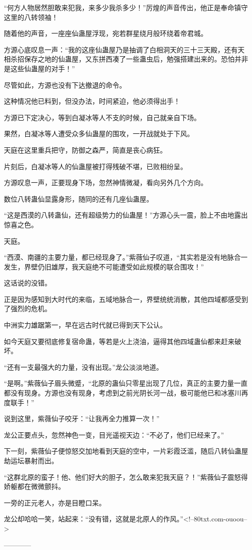 \begin{this_body}
“何方人物居然胆敢来犯我，来多少我杀多少！”厉煌的声音传出，他正是奉命镇守这里的八转领袖！

随着他的声音，一座座仙蛊屋浮现，宛若群星绕月般环绕着帝君城。

方源心底叹息一声：“我的这座仙蛊屋乃是抽调了白相洞天的三十三天殿，还有天相杀招保存之地的仙蛊屋，又东拼西凑了一些蛊虫后，勉强搭建出来的。恐怕并非是这些仙蛊屋的对手！”

尽管如此，方源也没有下达撤退的命令。

这种情况他已料到，但没办法，时间紧迫，他必须得出手！

方源已下定决心，等到白凝冰等人不支的时候，自己就亲自下场。

果然，白凝冰等人遭受众多仙蛊屋的围攻，一开战就处于下风。

天庭在这里重兵把守，防御之森严，简直是丧心病狂。

片刻后，白凝冰等人的仙蛊屋被打得残破不堪，已败相纷呈。

方源叹息一声，正要现身下场，忽然神情微凝，看向另外几个方向。

数位八转蛊仙显露身形，随同的还有几座仙蛊屋。

“这是西漠的八转蛊仙，还有超级势力的仙蛊屋！”方源心头一震，脸上不由地露出惊喜之色。

天庭。

“西漠、南疆的主要力量，都已经现身了。”紫薇仙子叹道，“其实若是没有地脉合一发生，界壁仍旧雄厚，我天庭绝不可能遭受如此规模的联合围攻！”

这话说的没错。

正是因为感知到大时代的来临，五域地脉合一，界壁统统消散，其他四域都感受到了强烈的危机。

中洲实力雄踞第一，早在远古时代就已得到天下公认。

如今天庭又要彻底修复宿命蛊，等若是火上浇油，逼得其他四域蛊仙都来赶来破坏。

“还有一支最强大的力量，没有出现。”龙公淡淡地道。

“是啊。”紫薇仙子眉头微蹙，“北原的蛊仙只零星出现了几位，真正的主要力量一直都没有现身。方源也没有现身，考虑到之前光阴长河一战，极可能他已和冰塞川再度联手！”

说到这里，紫薇仙子咬牙：“让我再全力推算一次！”

龙公正要点头，忽然神色一变，目光遥视天边：“不必了，他们已经来了。”

下一刻，紫薇仙子便惊怒交加地看到天庭的空中，一片彩霞泛滥，随后八转仙蛊屋劫运坛暴射而出。

“这群北原的蛮子！他、他们好大的胆子，怎么敢来犯我天庭？！”紫薇仙子震怒得娇躯都在微微颤抖。

一旁的正元老人，亦是目瞪口呆。

龙公却哈哈一笑，站起来：“没有错，这就是北原人的作风。”<!--80txt.com-ouoou-->

------------

\end{this_body}

